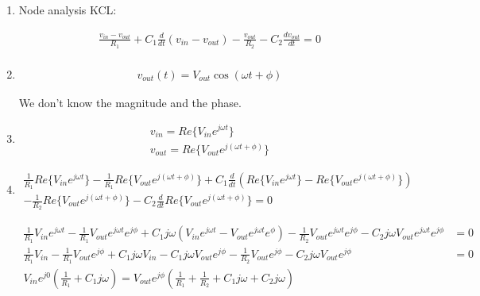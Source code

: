\documentclass[11pt]{article}
\begin{document}
\begin{enumerate}[\alph*)]

\item

Node analysis KCL:

\begin{align*}
\frac{v _{in} - v _{out}}{R_1} + C_1 \frac{d}{dt}(v _{in} - v _{out}) - \frac{v _{out}}{R_2} - C_2 \frac{d v _{out}}{dt} = 0\\
\end{align*}

\item

\begin{align*}
v _{out} (t) = V _{out} \cos (\omega t + \phi)
\end{align*}

We don't know the magnitude and the phase.

\item

\begin{align*}
v _{in} = Re \{ V _{in} e ^{j \omega t} \} \\
v _{out} = Re \{ V _{out} e ^{j (\omega t + \phi)} \}
\end{align*}

\item

\begin{align*}
\frac{1}{R_1} Re\{ V _{in} e ^{j \omega t} \} - \frac{1}{R_1} Re \{ V _{out} e ^{j (\omega t + \phi)} \} + C_1 \frac{d}{dt} (Re\{ V _{in} e ^{j \omega t} \} - Re \{ V _{out} e ^{j (\omega t + \phi)} \}) \\ 
- \frac{1}{R_2} Re \{ V _{out} e ^{j (\omega t + \phi)} \} - C_2 \frac{d}{dt} Re \{ V _{out} e ^{j (\omega t + \phi)} \} = 0
\end{align*}

\begin{align*}
\frac{1}{R_1} V _{in} e ^{j \omega t} - \frac{1}{R_1} V _{out} e ^{j \omega t} e ^{j \phi} + C_1 j \omega (V _{in} e ^{j \omega t} - V _{out} e ^{j \omega t} e ^{\phi}) - \frac{1}{R_2} V _{out} e ^{j \omega t} e ^{j \phi} - C_2 j \omega V _{out} e ^{j \omega t} e ^{j \phi} &= 0 \\
\frac{1}{R_1} V _{in} - \frac{1}{R_1} V _{out} e ^{j \phi} + C_1 j \omega V _{in} - C_1 j \omega V _{out} e ^{j \phi} - \frac{1}{R_2} V _{out} e ^{j \phi} - C_2 j \omega V _{out} e ^{j \phi} &= 0 \\
V _{in} e ^{j 0} (\frac{1}{R_1} + C_1 j \omega) = V _{out} e ^{j \phi} (\frac{1}{R_1} + \frac{1}{R_2} + C_1 j \omega + C_2 j \omega) \\
\end{align*}


\end{enumerate}
\end{document}
